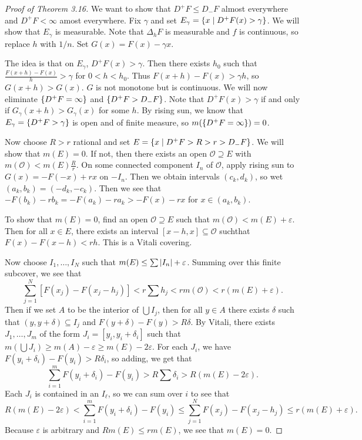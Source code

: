 \documentclass[leqno, openany]{memoir}
\theoremstyle{definition}
\theoremstyle{remark}
\theoremstyle{plain}
\theoremstyle{definition}
\theoremstyle{remark}
\newcommand{\ep}{\varepsilon}
\newcommand{\mc}[1]{\mathcal{#1}}
\begin{document}
\begin{proof}[Proof of Theorem 3.16]
    We want to show that $D^+ F \leq D_- F$ almost everywhere and $D^+ F < \infty$ amost everywhere. Fix $\gamma$ and set $E_{\gamma} = \qty{x \mid D^+ F(x) > \gamma}$. We will show that $E_{\gamma}$ is measurable. Note that $\Delta_h F$ is measurable and $f$ is continuous, so replace $h$ with $1/n$. Set $G(x) = F(x) - \gamma x$.

    The idea is that on $E_{\gamma}$, $D^+ F(x) > \gamma$. 
    Then there exists $h_0$ such that $\frac{F(x+h) - F(x)}{h} > \gamma$ for $0 < h < h_0$. Thus $F(x+h) - F(x) > \gamma h$, so $G(x+h) > G(x)$. $G$ is not monotone but is continuous. We will now eliminate $\qty{D^+ F=  \infty}$ and $\qty{D^+ F > D_- F}$. Note that $D^+ F(x) > \gamma$ if and only if $G_{\gamma}(x+h) > G_{\gamma}(x)$ for some $h$. By rising sun, we know that $E_{\gamma} = \qty{D^+ F > \gamma}$ is open and of finite measure, so $m\qty(\qty{D^+ F = \infty}) = 0$.

    Now choose $R > r$ rational and set $E = \qty{x \mid D^+F > R > r > D_- F}$. We will show that $m(E) = 0$. If not, then there exists an open $\mc{O} \supseteq E$ with $m(\mc{O}) < m(E) \frac{R}{r}$. On some connected component $I_n$ of $\mc{O}$, apply rising sun to $G(x) = -F(-x) + rx$ on $-I_n$. Then we obtain intervals $(c_k,d_k)$, so wet $(a_k, b_k) = (-d_k, -c_k)$. Then we see that $-F(b_k) - rb_k = -F(a_k) - ra_k > -F(x) - rx$ for $x \in (a_k,b_k)$.

    To show that $m(E) = 0$, find an open $\mc{O} \supseteq E$ such that $m(\mc{O}) < m(E) + \ep$. Then for all $x \in E$, there exists an interval $[x-h,x] \subseteq \mc{O}$ suchthat $F(x) - F(x-h) < rh$. This is a Vitali covering.

    Now choose $I_1, \ldots, I_N$ such that $m(E) \leq \sum \abs{I_n} + \ep$. Summing over this finite subcover, we see that
    \[ \sum_{j=1}^N [F(x_j) - F(x_j - h_j)] < r \sum h_j < rm(\mc{O}) < r(m(E) + \ep). \]
    Then if we set $A$ to be the interior of $\bigcup I_j$, then for all $y \in A$ there exists $\delta$ such that $(y,y+\delta) \subseteq I_j$ and $F(y+\delta) - F(y) > R \delta$. By Vitali, there exists $J_1, \ldots, J_m$ of the form $J_i = [y_i, y_i + \delta_i]$ such that $m(\bigcup J_i) \geq m(A) - \ep \geq m(E) - 2 \ep$. For each $J_i$, we have $F(y_i + \delta_i) - F(y_i) > R \delta_i$, so adding, we get that
    \[ \sum_{i=1}^m F(y_i + \delta_i) - F(y_i) > R \sum \delta_i > R(m(E) - 2 \ep). \]
    Each $J_i$ is contained in an $I_{\ell}$, so we can sum over $i$ to see that
    \[ R(m(E) - 2 \ep) < \sum_{i=1}^m F(y_i + \delta_i) - F(y_i) \leq \sum_{j=1}^N F(x_j) - F(x_j- h_j) \leq r(m(E) + \ep). \]
    Because $\ep$ is arbitrary and $Rm(E) \leq r m(E)$, we see that $m(E) = 0$.
\end{proof}
\end{document}
